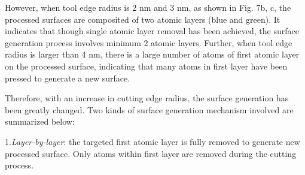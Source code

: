 \documentclass{article}
\begin{document}
However, when tool edge radius is 2 nm and 3 nm, as shown in Fig. 7b, c, the processed surfaces are composited of two atomic layers (blue and green). It indicates that though single atomic layer removal has been achieved, the surface generation process involves minimum 2 atomic layers. Further, when tool edge radius is larger than 4 nm, there is a large number of atoms of first atomic layer on the processed surface, indicating that many atoms in first layer have been pressed to generate a new surface.

Therefore, with an increase in cutting edge radius, the surface generation has been greatly changed. Two kinds of surface generation mechanism involved are summarized below:

\begin{hangpars}
1.\quad \emph{Layer-by-layer}: the targeted first atomic layer is fully removed to generate new processed surface. Only atoms within first layer are removed during the cutting process.
\end{hangpars}
\end{document}
